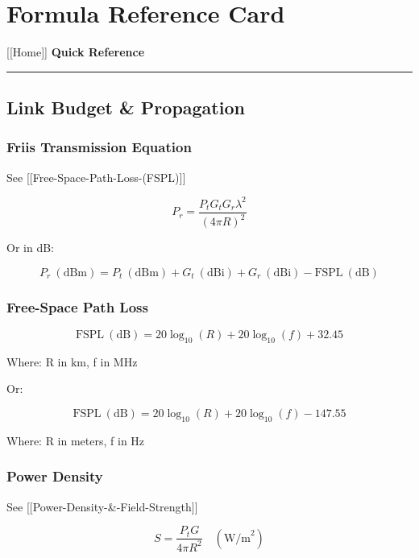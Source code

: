 \section{Formula Reference Card}\label{formula-reference-card}

{[}{[}Home{]}{]} \textbar{} \textbf{Quick Reference}

\begin{center}\rule{0.5\linewidth}{0.5pt}\end{center}

\subsection{\texorpdfstring{ Link Budget \&
Propagation}{ Link Budget \& Propagation}}\label{link-budget-propagation}

\subsubsection{Friis Transmission
Equation}\label{friis-transmission-equation}

See {[}{[}Free-Space-Path-Loss-(FSPL){]}{]}

\[
P_r = \frac{P_t G_t G_r \lambda^2}{(4\pi R)^2}
\]

Or in dB:

\[
P_r\ (\text{dBm}) = P_t\ (\text{dBm}) + G_t\ (\text{dBi}) + G_r\ (\text{dBi}) - \text{FSPL}\ (\text{dB})
\]

\subsubsection{Free-Space Path Loss}\label{free-space-path-loss}

\[
\text{FSPL}\ (\text{dB}) = 20\log_{10}(R) + 20\log_{10}(f) + 32.45
\]

Where: R in km, f in MHz

Or:

\[
\text{FSPL}\ (\text{dB}) = 20\log_{10}(R) + 20\log_{10}(f) - 147.55
\]

Where: R in meters, f in Hz

\subsubsection{Power Density}\label{power-density}

See {[}{[}Power-Density-\&-Field-Strength{]}{]}

\[
S = \frac{P_t G}{4\pi R^2} \quad (\text{W/m}^2)
\]

